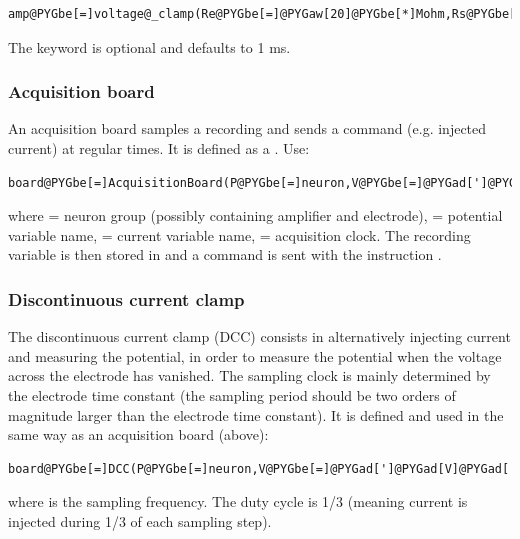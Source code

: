 \documentclass[letterpaper,10pt,english]{manual}
\begin{document}
\begin{Verbatim}[commandchars=@\[\]]
amp@PYGbe[=]voltage@_clamp(Re@PYGbe[=]@PYGaw[20]@PYGbe[*]Mohm,Rs@PYGbe[=]@PYGaw[10]@PYGbe[*]Mohm,tau@_u@PYGbe[=]@PYGaw[1]@PYGbe[*]ms)
\end{Verbatim}

The  keyword is optional and defaults to 1 ms.


\subsubsection{Acquisition board}

An acquisition board samples a recording
and sends a command (e.g. injected current)
at regular times. It is defined as a
\hyperlink{brian.NeuronGroup}{}.
Use:

\begin{Verbatim}[commandchars=@\[\]]
board@PYGbe[=]AcquisitionBoard(P@PYGbe[=]neuron,V@PYGbe[=]@PYGad[']@PYGad[V]@PYGad['],I@PYGbe[=]@PYGad[']@PYGad[I]@PYGad['],clock)
\end{Verbatim}

where  = neuron group (possibly containing amplifier and electrode),
 = potential variable name,
 = current variable name,
 = acquisition clock. The recording variable is then stored in
 and a command is sent with the instruction .


\subsubsection{Discontinuous current clamp}

The discontinuous current clamp (DCC) consists in alternatively injecting current
and measuring the potential, in order to measure the potential when the voltage
across the electrode has vanished. The sampling clock is mainly determined by the
electrode time constant (the sampling period should be two orders of magnitude larger
than the electrode time constant).
It is defined and used in the same way as an acquisition board (above):

\begin{Verbatim}[commandchars=@\[\]]
board@PYGbe[=]DCC(P@PYGbe[=]neuron,V@PYGbe[=]@PYGad[']@PYGad[V]@PYGad['],I@PYGbe[=]@PYGad[']@PYGad[I]@PYGad['],frequency@PYGbe[=]@PYGaw[2]@PYGbe[*]kHz)
\end{Verbatim}

where  is the sampling frequency. The duty cycle is 1/3
(meaning current is injected during 1/3 of each sampling step).
\end{document}
